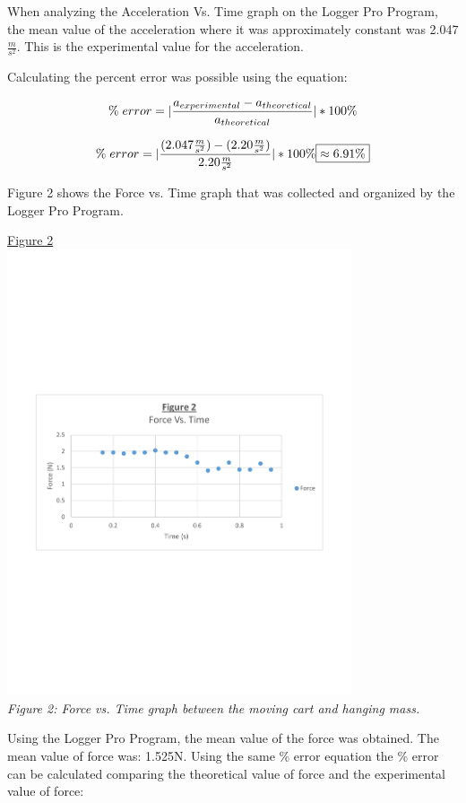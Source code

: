 \documentclass[aps,letterpaper,11pt]{revtex4}
\begin{document}
When analyzing the Acceleration Vs. Time graph on the Logger Pro Program, the mean value of the acceleration where it was approximately constant was 2.047$\frac{m}{s^2}$. This is the experimental value for the acceleration.

Calculating the percent error was possible using the equation:

$$ \% \hspace{1mm} error = |\frac{a_{experimental} - a_{theoretical}}{a_{theoretical}}|*100\%$$

$$ \% \hspace{1mm} error = |\frac{(2.047\frac{m}{s^2}) - (2.20\frac{m}{s^2})}{2.20\frac{m}{s^2}}|*100\% \boxed{\approx 6.91\%} $$

Figure 2 shows the Force vs. Time graph that was collected and organized by the Logger Pro Program.

\begin{center}
\underline{Figure 2}\\
\vspace{-30mm}
\includegraphics[width=4in]{ForceVsTimeGraph.pdf}\\
\vspace{-40mm}
\textit{Figure 2: Force vs. Time graph between the moving cart and hanging mass.}
\end{center}

Using the Logger Pro Program, the mean value of the force was obtained. The mean value of force was: 1.525N. Using the same \% error equation the \% error can be calculated comparing the theoretical value of force and the experimental value of force:
\end{document}

